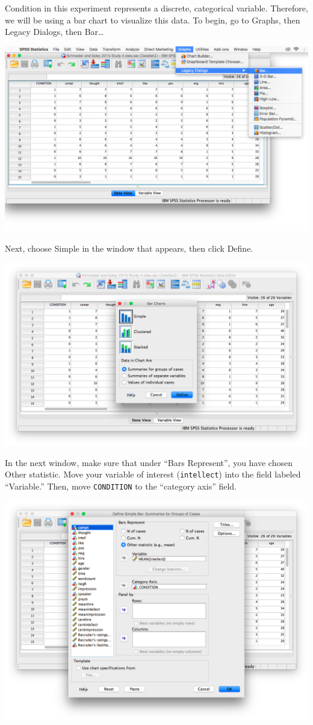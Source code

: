 \documentclass[
]{book}
\begin{document}
Condition in this experiment represents a discrete, categorical variable. Therefore, we will be using a bar chart to visualize this data. To begin, go to {Graphs}, then {Legacy Dialogs}, then {Bar\ldots{}}

\includegraphics{img/7.4.18.png}

Next, choose {Simple} in the window that appears, then click {Define}.

\includegraphics{img/7.4.19.png}

In the next window, make sure that under ``Bars Represent'', you have chosen {Other statistic}. Move your variable of interest (\texttt{intellect}) into the field labeled ``Variable.'' Then, move \texttt{CONDITION} to the ``category axis'' field.

\includegraphics{img/7.4.20.png}
\end{document}
